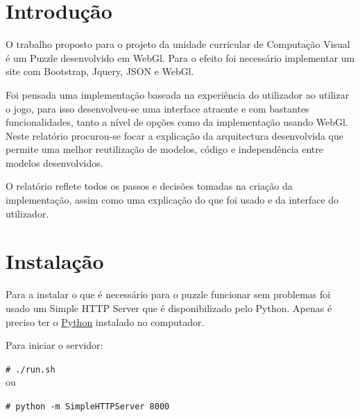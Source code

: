 \documentclass[pdftex,12pt,a4paper]{report}
\newcommand{\shellcmd}[1]{\indent\indent\texttt{\footnotesize\# #1}\\}
\begin{document}
\renewcommand{\headrulewidth}{0pt}

\fancyhead{}
\fancyfoot{}
\rfoot{\thepage}

\renewcommand*\contentsname{Conteúdos}
\renewcommand*\figurename{Figura}
\renewcommand*\tablename{Tabela}

\tableofcontents
\renewcommand{\headrulewidth}{0.15pt}
\renewcommand{\thechapter}{}

\clearpage

\section{Introdução}
O trabalho proposto para o projeto da unidade curricular de Computação Visual é um Puzzle desenvolvido em WebGl. Para o efeito foi necessário implementar um site com Bootstrap, Jquery, JSON e WebGl.

Foi pensada uma implementação baseada na experiência do utilizador ao utilizar o jogo, para isso desenvolveu-se uma interface atraente e com bastantes funcionalidades, tanto a nível de opções como da implementação usando WebGl. Neste relatório procurou-se focar a explicação da arquitectura desenvolvida que permite uma melhor reutilização de modelos, código e independência entre modelos desenvolvidos.

O relatório reflete todos os passos e decisões tomadas na criação da implementação, assim como uma explicação do que foi usado e da interface do utilizador.

\clearpage

\section{Instalação}

Para a instalar o que é necessário para o puzzle funcionar sem problemas foi usado um Simple HTTP Server que é disponibilizado pelo Python. Apenas é preciso ter o \href{https://www.python.org/downloads/}{Python} instalado no computador.

Para iniciar o servidor:

\shellcmd{./run.sh}

ou

\shellcmd{python -m SimpleHTTPServer 8000}
\end{document}
